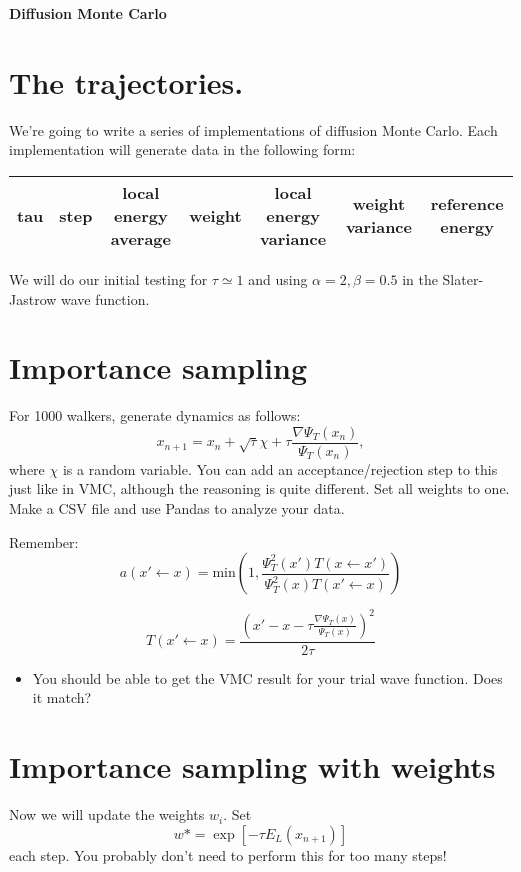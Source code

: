\documentclass[12pt]{article}
\begin{document}
	{\bf Diffusion Monte Carlo } 

\section*{The trajectories.} 

We're going to write a series of implementations of diffusion Monte Carlo.
Each implementation will generate data in the following form: 

\begin{tabular}{ccccccc}
tau&step&local energy average&weight&local energy variance &weight variance&reference energy\\
\hline
\end{tabular}


We will do our initial testing for $\tau\simeq 1$ and using $\alpha=2,\beta=0.5$ in the Slater-Jastrow wave function.
	
\section{Importance sampling} 

For 1000 walkers, generate dynamics as follows: 
\begin{equation}
x_{n+1} = x_n + \sqrt{\tau}\chi + \tau \frac{\nabla \Psi_T(x_n)}{\Psi_T(x_n)},
\end{equation}
where $\chi$ is a random variable. 
You can add an acceptance/rejection step to this just like in VMC, although the reasoning is quite different.
Set all weights to one.
Make a CSV file and use Pandas to analyze your data. 

Remember:
\begin{equation}
	a(x' \leftarrow x) = \text{min}\left(1,\frac{\Psi_T^2(x') T(x \leftarrow x')}{\Psi_T^2(x) T(x' \leftarrow x)} \right)
\end{equation}

\begin{equation}
	T(x'\leftarrow x) = \frac{ \left(x' - x - \tau \frac{\nabla \Psi_T(x)}{\Psi_T(x)}\right)^2}{ 2\tau}
\end{equation}

\begin{itemize}
\item You should be able to get the VMC result for your trial wave function. Does it match? 
\end{itemize}

\section{Importance sampling with weights}
Now we will update the weights $w_i$. Set 
\begin{equation}
w*=	\exp[-\tau E_L(x_{n+1})] 
\end{equation}
each step.
You probably don't need to perform this for too many steps!
\end{document}
